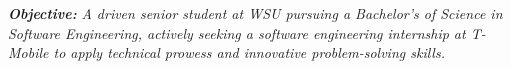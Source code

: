 \textbf{\textit{Objective:}}
\textit{A driven senior student at WSU pursuing a Bachelor's of Science in Software Engineering, actively seeking a software engineering internship at T-Mobile to apply technical prowess and innovative problem-solving skills.} \\

